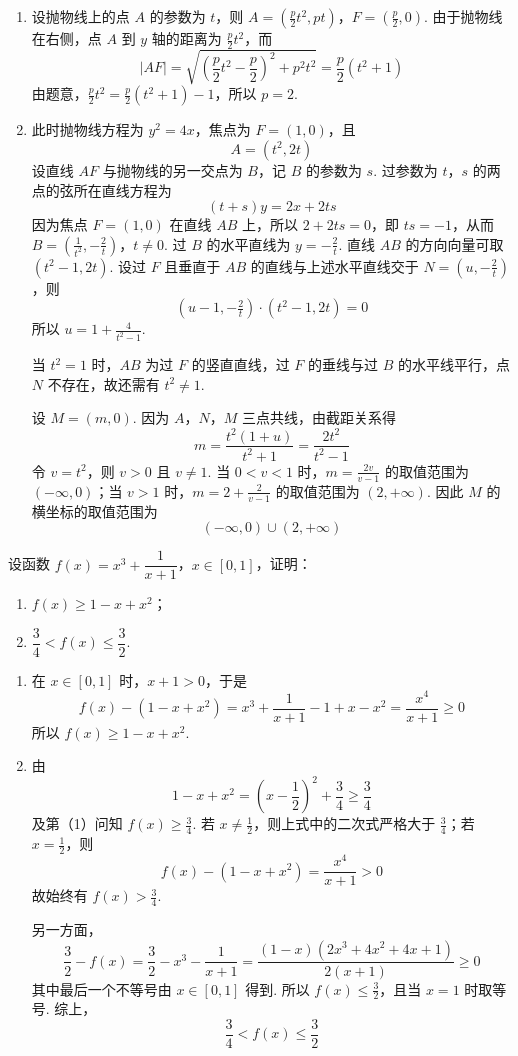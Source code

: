 \begin{solution}
\begin{enumerate}
\item 设抛物线上的点 \(A\) 的参数为 \(t\)，则
\(A=\left(\frac p2t^2,pt\right)\)，\(F=\left(\frac p2,0\right)\).
由于抛物线在右侧，点 \(A\) 到 \(y\) 轴的距离为 \(\frac p2t^2\)，而
\[
|AF|=\sqrt{\left(\frac p2t^2-\frac p2\right)^2+p^2t^2}=\frac p2(t^2+1)
\]
由题意，\(\frac p2t^2=\frac p2(t^2+1)-1\)，所以 \(p=2\).

\item 此时抛物线方程为 \(y^2=4x\)，焦点为 \(F=(1,0)\)，且
\[
A=(t^2,2t)
\]
设直线 \(AF\) 与抛物线的另一交点为 \(B\)，记 \(B\) 的参数为 \(s\). 过参数为 \(t\)，\(s\) 的两点的弦所在直线方程为
\[
(t+s)y=2x+2ts
\]
因为焦点 \(F=(1,0)\) 在直线 \(AB\) 上，所以 \(2+2ts=0\)，即 \(ts=-1\)，从而
\(B=\left(\frac1{t^2},-\frac2t\right)\)，\(t\ne0\).
过 \(B\) 的水平直线为 \(y=-\frac2t\). 直线 \(AB\) 的方向向量可取 \((t^2-1,2t)\). 设过 \(F\) 且垂直于 \(AB\) 的直线与上述水平直线交于 \(N=(u,-\frac2t)\)，则
\[
(u-1,-\tfrac2t)\cdot(t^2-1,2t)=0
\]
所以 \(u=1+\frac4{t^2-1}\).

当 \(t^2=1\) 时，\(AB\) 为过 \(F\) 的竖直直线，过 \(F\) 的垂线与过 \(B\) 的水平线平行，点 \(N\) 不存在，故还需有 \(t^2\ne1\).

设 \(M=(m,0)\). 因为 \(A\)，\(N\)，\(M\) 三点共线，由截距关系得
\[
m=\frac{t^2(1+u)}{t^2+1}=\frac{2t^2}{t^2-1}
\]
令 \(v=t^2\)，则 \(v>0\) 且 \(v\ne1\). 当 \(0<v<1\) 时，\(m=\frac{2v}{v-1}\) 的取值范围为 \((-\infty,0)\)；当 \(v>1\) 时，\(m=2+\frac2{v-1}\) 的取值范围为 \((2,+\infty)\). 因此 \(M\) 的横坐标的取值范围为
\[
(-\infty,0)\cup(2,+\infty)
\]
\end{enumerate}
\end{solution}

\begin{problem}
设函数 \(f(x)=x^3+\dfrac{1}{x+1}\)，\(x\in[0,1]\)，证明：

\begin{enumerate}
\item \(f(x)\ge1-x+x^2\)；
\item \(\dfrac34<f(x)\le\dfrac32\).
\end{enumerate}
\end{problem}

\begin{solution}
\begin{enumerate}
\item 在 \(x\in[0,1]\) 时，\(x+1>0\)，于是
\[
f(x)-(1-x+x^2)=x^3+\frac1{x+1}-1+x-x^2=\frac{x^4}{x+1}\geqslant0
\]
所以 \(f(x)\geqslant1-x+x^2\).

\item 由
\[
1-x+x^2=\left(x-\frac12\right)^2+\frac34\geqslant\frac34
\]
及第（1）问知 \(f(x)\geqslant\frac34\). 若 \(x\ne\frac12\)，则上式中的二次式严格大于 \(\frac34\)；若 \(x=\frac12\)，则
\[
f(x)-(1-x+x^2)=\frac{x^4}{x+1}>0
\]
故始终有 \(f(x)>\frac34\).

另一方面，
\[
\frac32-f(x)=\frac32-x^3-\frac1{x+1}=\frac{(1-x)(2x^3+4x^2+4x+1)}{2(x+1)}\geqslant0
\]
其中最后一个不等号由 \(x\in[0,1]\) 得到. 所以 \(f(x)\leqslant\frac32\)，且当 \(x=1\) 时取等号. 综上，
\[
\frac34<f(x)\leqslant\frac32
\]
\end{enumerate}
\end{solution}
